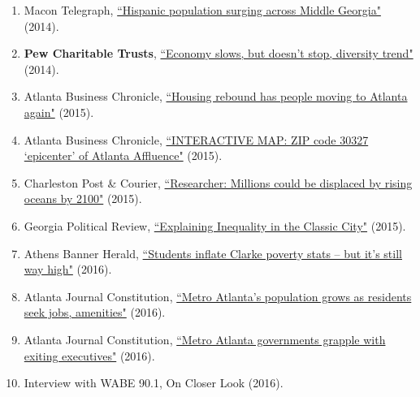 \begin{enumerate}
    \item Macon Telegraph, \href{http://www.macon.com/news/local/article30133884.html}{``Hispanic population surging across Middle Georgia"} (2014).
    \item \textbf{Pew Charitable Trusts}, \href{http://www.pewtrusts.org/en/research-and-analysis/blogs/stateline/2014/07/09/economy-slows-but-doesnt-stop-diversity-trend}{``Economy slows, but doesn't stop, diversity trend"} (2014).
    \item Atlanta Business Chronicle, \href{http://www.bizjournals.com/atlanta/print-edition/2015/08/07/housing-rebound-has-people-moving-to-atlanta-again.html}{``Housing       rebound has people moving to Atlanta again"} (2015).
    \item Atlanta Business Chronicle, \href{http://www.bizjournals.com/atlanta/print-edition/2015/11/20/zip-code-30327-epicenter-of-atlanta-affluence-sli.html}{``INTERACTIVE     MAP: ZIP code 30327 `epicenter' of Atlanta Affluence"} (2015).
    \item Charleston Post \& Courier, \href{http://www.postandcourier.com/article/20150331/PC16/150339871/1177/researcher-millions-could-be-displaced-by-rising-oceans-by-210    0}{``Researcher: Millions could be displaced by rising oceans by 2100"} (2015).
    \item Georgia Political Review, \href{http://georgiapoliticalreview.com/explaining-inequality-in-the-classic-city-2/}{``Explaining Inequality in the Classic City"}         (2015).
    \item Athens Banner Herald, \href{http://onlineathens.com/mobile/2016-01-05/students-inflate-clarke-poverty-stats-its-still-way-high}{``Students inflate Clarke poverty     stats -- but it's still way high"} (2016).
    \item Atlanta Journal Constitution, \href{http://www.myajc.com/news/news/local-govt-politics/metro-atlantas-population-grows-as-residents-seek-/nqtz8/}{``Metro Atlanta's     population grows as residents seek jobs, amenities"} (2016).
    \item Atlanta Journal Constitution, \href{http://www.myajc.com/news/local-govt--politics/metro-atlanta-governments-grapple-with-exiting-executives/nf7q22yhOMt2atvWoo6xdO/}{``Metro Atlanta governments grapple with exiting executives"} (2016).
    \item Interview with WABE 90.1, On Closer Look (2016).
     

\end{enumerate}
